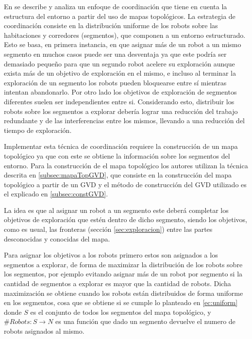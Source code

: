 En \cite{wurm2008coordinated} se describe y analiza un enfoque de coordinación
que tiene en cuenta la estructura del entorno a partir del uso de mapas
topológicos. La estrategia de coordinación consiste en la distribución uniforme
de los robots sobre las habitaciones y corredores (segmentos), que componen a
un entorno estructurado. Esto se basa, en primera instancia, en que asignar más
de un robot a un mismo segmento en muchos casos puede ser una desventaja ya que
este podría ser demasiado pequeño para que un segundo robot acelere su
exploración aunque exista más de un objetivo de exploración en el mismo, e
incluso al terminar la exploración de un segmento los robots pueden bloquearse
entre sí mientras intentan abandonarlo. Por otro lado los objetivos de exploración
de segmentos diferentes suelen ser independientes entre si. Considerando esto,
distribuir los robots sobre los segmentos a explorar debería lograr una
reducción del trabajo redundante y de las interferencias entre los mismos,
llevando a una reducción del tiempo de exploración.

Implementar esta técnica de coordinación requiere la construcción de un mapa topológico ya que con este se obtiene la información sobre los segmentos del entorno. Para la construcción de el mapa topológico los autores utilizan la técnica descrita en \ref{subsec:mapaTopGVD}, que consiste en la construcción del mapa topológico a partir de un GVD y el método de construcción del GVD utilizado es el explicado en \ref{subsec:constGVD}.

La idea es que al asignar un robot a un segmento este deberá completar los objetivos de exploración que estén dentro de dicho segmento, siendo los objetivos, como es usual, las fronteras (sección \ref{sec:exploracion}) entre las partes desconocidas y conocidas del mapa. 

Para asignar los objetivos a los robots primero estos son asignados a los segmentos a explorar, de forma de maximizar la distribución de los robots sobre los segmentos, por ejemplo evitando asignar más de un robot por segmento si la cantidad de segmentos a explorar es mayor que la cantidad de robots. Dicha maximización se obtiene cuando los robots están distribuidos de forma uniforme en los segmentos, cosa que se obtiene si se cumple lo planteado en \eqref{ec:uniform} donde $S$ es el conjunto de todos los segmentos del mapa topológico, y $\#Robots : S \rightarrow N$ es una función que dado un segmento devuelve el numero de robots asignados al mismo. 

